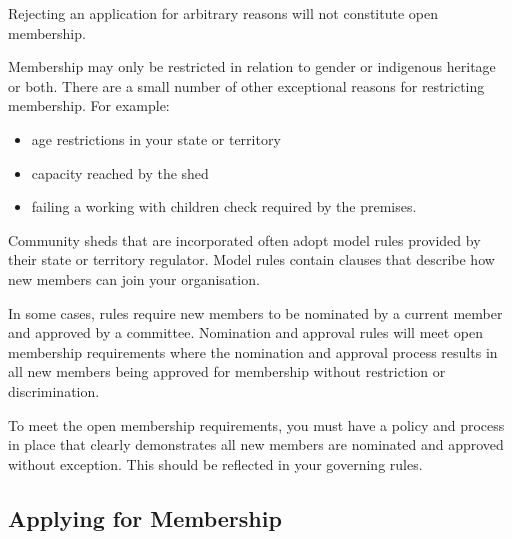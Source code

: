 \documentclass[../constitution.tex]{subfiles}
\begin{document}
{  Rejecting an application for arbitrary reasons will not constitute open membership.

  Membership may only be restricted in relation to gender or indigenous heritage or both. There are a small number of other exceptional reasons for restricting membership. For example:

  \begin{itemize}
  \item age restrictions in your state or territory
  \item capacity reached by the shed
  \item failing a working with children check required by the premises.
  \end{itemize} 

  Community sheds that are incorporated often adopt model rules provided by their state or territory regulator. Model rules contain clauses that describe how new members can join your organisation.

  In some cases, rules require new members to be nominated by a current member and approved by a committee. Nomination and approval rules will meet open membership requirements where the nomination and approval process results in all new members being approved for membership without restriction or discrimination.

  To meet the open membership requirements, you must have a policy and process in place that clearly demonstrates all new members are nominated and approved without exception. This should be reflected in your governing rules.
}


\subsection{Applying for Membership} \label{applying-for-membership}
\end{document}
